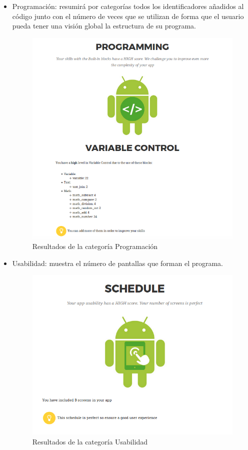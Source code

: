 \documentclass[a4paper, 12pt]{book}
\begin{document}
\begin{itemize}
\begin{itemize}
\begin{figure}[H]
			  \label{fig:compResults}
		\end{figure} 
		\item Programación: resumirá por categorías todos los identificadores añadidos al código junto con el número de veces que se utilizan de forma que el usuario pueda tener una visión global la estructura de su programa.      
		\begin{figure}[H]
			  \centering
			  \includegraphics[width=0.60\linewidth, keepaspectratio]{img/programmingScore}
			  \caption{Resultados de la categoría Programación}
			  \label{fig:progrResults}
		\end{figure} 
		\item Usabilidad: muestra el número de pantallas que forman el programa.       
		\begin{figure}[H]
			  \centering
			  \includegraphics[width=0.50\linewidth, keepaspectratio]{img/schedScore}
			  \caption{Resultados de la categoría Usabilidad}
			  \label{fig:schedResults}
		\end{figure} 
	\end{itemize}
\end{itemize}
\end{document}
